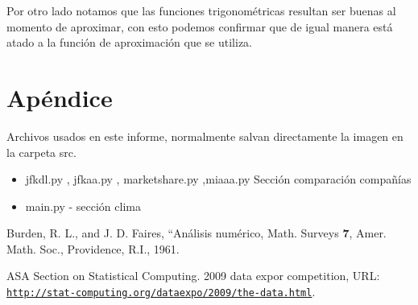 \documentclass{endm}
\begin{document}
Por otro lado notamos que las funciones trigonométricas resultan ser buenas al momento de aproximar, con esto podemos confirmar que de igual manera está atado a la función de aproximación que se utiliza.

\section{Apéndice}
Archivos usados en este informe, normalmente salvan directamente la imagen en la carpeta src.
\begin{itemize}
\item jfkdl.py , jfkaa.py , marketshare.py ,miaaa.py Sección comparación compañías
\item main.py - sección clima 
\end{itemize}
\begin{thebibliography}{10}\label{bibliography}
  
 Burden, R. L., and J. D. Faires, ``Análisis numérico,
 Math. Surveys \textbf{7}, Amer. Math. Soc.,
  Providence, R.I., 1961.
  
 ASA Section on Statistical Computing. 2009 data expor competition, URL:
  \href{http://stat-computing.org/dataexpo/2009/the-data.html}
  {\texttt{http://stat-computing.org/dataexpo/2009/the-data.html}}.

\end{thebibliography}
\end{document}
